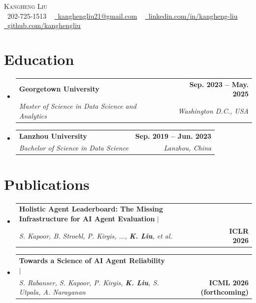 \documentclass[letterpaper,11pt]{article}
\makeatletter
\newcommand{\resumeSubheading}[4]{
  \vspace{-2pt}\item
    \begin{tabular*}{1.0\textwidth}[t]{l@{\extracolsep{\fill}}r}
      \textbf{#1} & \textbf{\small #2} \\
      \textit{\small#3} & \textit{\small #4} \\
    \end{tabular*}\vspace{-7pt}
}
\newcommand{\resumeProjectHeading}[2]{
    \item
    \begin{tabular*}{1.001\textwidth}{l@{\extracolsep{\fill}}r}
      \small#1 & \textbf{\small #2}\\
    \end{tabular*}\vspace{-7pt}
}
\newcommand{\resumeSubHeadingListStart}{\begin{itemize}[leftmargin=0.0in, label={}]}
\newcommand{\resumeSubHeadingListEnd}{\end{itemize}}
\makeatother
\begin{document}

\begin{center}
    {\Huge \scshape Kangheng Liu} \\ \vspace{1pt}
    \small \raisebox{-0.1\height}\faPhone\ 202-725-1513 ~ \href{mailto:kanghengliu21@gmail.com}{\raisebox{-0.2\height}\faEnvelope\  \underline{kanghengliu21@gmail.com}} ~
    \href{https://www.linkedin.com/in/kangheng-liu/}{\raisebox{-0.2\height}\faLinkedin\ \underline{linkedin.com/in/kangheng-liu}}  ~
    \href{https://github.com/kanghengliu}{\raisebox{-0.2\height}\faGithub\ \underline{github.com/kanghengliu}}
    \vspace{-8pt}
\end{center}


\section{Education}
  \resumeSubHeadingListStart
    \resumeSubheading
      {Georgetown University}{Sep. 2023 -- May. 2025}
      {Master of Science in Data Science and Analytics}{Washington D.C., USA}
    \resumeSubheading
      {Lanzhou University}{Sep. 2019 -- Jun. 2023}
      {Bachelor of Science in Data Science}{Lanzhou, China}
  \resumeSubHeadingListEnd

\section{Publications}
  \resumeSubHeadingListStart
    \resumeProjectHeading
      {\textbf{Holistic Agent Leaderboard: The Missing Infrastructure for AI Agent Evaluation} $|$ \\ \emph{S. Kapoor, B. Stroebl, P. Kirgis, $\ldots$, \textbf{K. Liu}, et al.}}{ICLR 2026}
      \vspace{-7pt}
    \resumeProjectHeading
      {\textbf{Towards a Science of AI Agent Reliability} $|$ \\ \emph{S. Rabanser, S. Kapoor, P. Kirgis, \textbf{K. Liu}, S. Utpala, A. Narayanan}}{ICML 2026 (forthcoming)}
  \resumeSubHeadingListEnd
  \vspace{-5pt}
\end{document}
